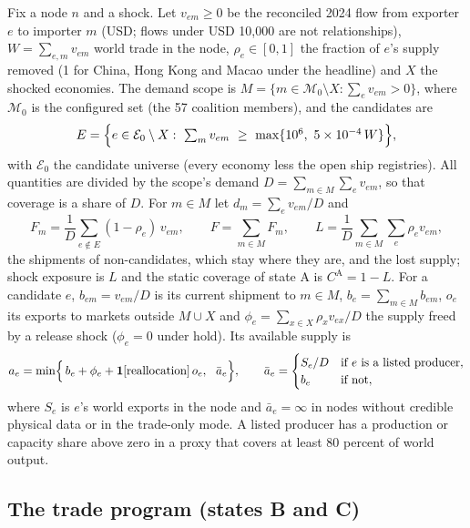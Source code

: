 Fix a node $n$ and a shock. Let $v_{em}\ge0$ be the reconciled 2024 flow from exporter $e$ to importer
$m$ (USD; flows under USD 10{,}000 are not relationships), $W=\sum_{e,m}v_{em}$ world trade in the node,
$\rho_e\in[0,1]$ the fraction of $e$'s supply removed (1 for China, Hong Kong and Macao under the
headline) and $X$ the shocked economies. The demand scope is $M=\{m\in\mathcal M_0\setminus X:
\sum_e v_{em}>0\}$, where $\mathcal M_0$ is the configured set (the 57 coalition members), and the
candidates are
\begin{equation}\label{eq:alg_candidates}
  E=\Bigl\{e\in\mathcal E_0\setminus X:\ \textstyle\sum_m v_{em}\ \ge\ \max\{10^{6},\ 5\times10^{-4}\,W\}\Bigr\},
\end{equation}
with $\mathcal E_0$ the candidate universe (every economy less the open ship registries). All
quantities are divided by the scope's demand $D=\sum_{m\in M}\sum_e v_{em}$, so that coverage is a share
of $D$. For $m\in M$ let $d_m=\sum_e v_{em}/D$ and
\begin{equation}\label{eq:alg_fixed}
  F_m=\frac1D\sum_{e\notin E}(1-\rho_e)\,v_{em},\qquad F=\sum_{m\in M}F_m,\qquad
  L=\frac1D\sum_{m\in M}\sum_e\rho_e v_{em},
\end{equation}
the shipments of non-candidates, which stay where they are, and the lost supply; shock exposure is $L$
and the static coverage of state A is $C^{\mathrm A}=1-L$. For a candidate $e$, $b_{em}=v_{em}/D$ is
its current shipment to $m\in M$, $b_e=\sum_{m\in M}b_{em}$, $o_e$ its exports to markets outside
$M\cup X$ and $\phi_e=\sum_{x\in X}\rho_x v_{ex}/D$ the supply freed by a release shock ($\phi_e=0$
under hold). Its available supply is
\begin{equation}\label{eq:alg_avail}
  a_e=\min\Bigl\{\,b_e+\phi_e+\mathbf{1}[\text{reallocation}]\,o_e,\ \ \bar a_e\Bigr\},\qquad
  \bar a_e=\begin{cases}S_e/D & \text{if $e$ is a listed producer},\\ b_e & \text{if not},\end{cases}
\end{equation}
where $S_e$ is $e$'s world exports in the node and $\bar a_e=\infty$ in nodes without credible physical
data or in the trade-only mode. A listed producer has a production or capacity share above zero in a
proxy that covers at least 80 percent of world output.

\subsection{The trade program (states B and C)}
\label{subsec:alg_trade}

